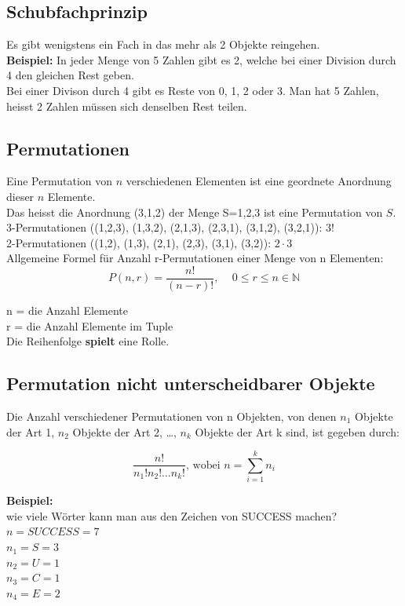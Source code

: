 \documentclass[12pt]{scrartcl}
\begin{document}
\subsection{Schubfachprinzip}
Es gibt wenigstens ein Fach in das mehr als 2 Objekte reingehen.\\

\textbf{Beispiel:} In jeder Menge von 5 Zahlen gibt es 2, welche bei einer
Division durch 4 den gleichen Rest geben.\\
Bei einer Divison durch 4 gibt es Reste von 0, 1, 2 oder 3. Man hat 5 Zahlen, heisst
2 Zahlen müssen sich denselben Rest teilen.\\


\newpage 
\subsection{Permutationen}
Eine Permutation von $n$ verschiedenen Elementen ist eine geordnete Anordnung dieser $n$ Elemente.\\
Das heisst die Anordnung (3,1,2) der Menge S={1,2,3} ist eine Permutation von $S$.\\
3-Permutationen ((1,2,3), (1,3,2), (2,1,3), (2,3,1), (3,1,2), (3,2,1)): 3!\\
2-Permutationen ((1,2), (1,3), (2,1), (2,3), (3,1), (3,2)): $2 \cdot 3$\\

Allgemeine Formel für Anzahl r-Permutationen einer Menge von n Elementen:\\

\[P(n, r) = \frac{n!}{(n-r)!}\text{, } \quad 0 \leq r \leq n \in \mathbb{N}\]

n = die Anzahl Elemente\\
r = die Anzahl Elemente im Tuple\\

Die Reihenfolge \textbf{spielt} eine Rolle.


\subsection{Permutation nicht unterscheidbarer Objekte}
Die Anzahl verschiedener Permutationen von n Objekten, von denen $n_1$ Objekte der Art 1, $n_2$ Objekte der Art 2, 
\dots, $n_k$ Objekte der Art k sind, ist gegeben durch:

\[\frac{n!}{n_1!n_2! \dots n_k!} \text{, wobei } n = \sum_{i=1}^{k} n_i\]

\textbf{Beispiel:}\\
wie viele Wörter kann man aus den Zeichen von SUCCESS machen?\\
$n = SUCCESS = 7$\\
$n_1 = S = 3$\\
$n_2 = U = 1$\\
$n_3 = C = 1$\\
$n_4 = E = 2$\\
\end{document}
